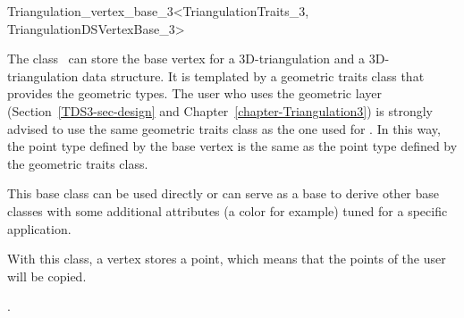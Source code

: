 

\begin{ccRefClass}{Triangulation_vertex_base_3<TriangulationTraits_3, TriangulationDSVertexBase_3>}  %


\ccDefinition

The class \ccRefName\ can store the base vertex for a 3D-triangulation and a 3D-triangulation data structure. It is templated by a
geometric traits class  that provides the geometric
types. The user who uses the geometric layer
(Section~\ref{TDS3-sec-design} and
Chapter~\ref{chapter-Triangulation3}) is strongly advised to use the
same geometric traits class  as the one used for
.
In this way, the point type
defined by the base vertex is the same as the point type defined by
the geometric traits class.

This base class can be used directly or can serve as a base to derive
other base classes with some additional attributes (a color for
example) tuned for a specific application.

With this class, a vertex stores a point, which means that the points
of the user will be copied.


\ccIsModel


\ccSeeAlso

.



\end{ccRefClass}


